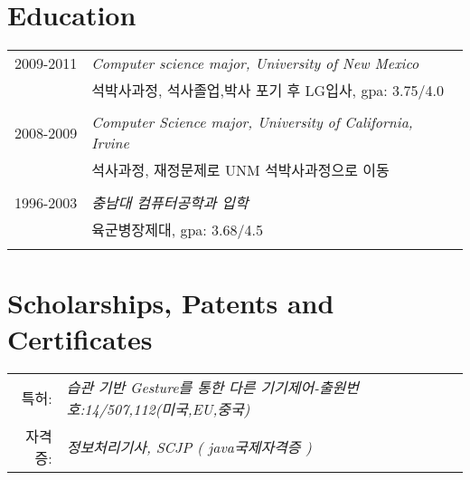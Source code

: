 \documentclass[a4paper,10pt]{article} %
\begin{document}
\bigskip
\section{Education}

\begin{tabular}{r|p{11cm}}
\textsc{2009-2011} & \emph{Computer science major, University of New Mexico}\\
& \footnotesize{석박사과정, 석사졸업,박사 포기 후 LG입사, gpa: 3.75/4.0 }\\
\multicolumn{2}{c}{} \\

\textsc{2008-2009} & \emph{Computer Science major, University of California, Irvine} \\
& \footnotesize{석사과정, 재정문제로 UNM 석박사과정으로 이동} \\
\multicolumn{2}{c}{} \\

\textsc{1996-2003} & \emph{충남대 컴퓨터공학과 입학}\\
& \footnotesize{육군병장제대, gpa: 3.68/4.5} \\
\multicolumn{2}{c}{} \\

\end{tabular}

\bigskip
\section{Scholarships, Patents and Certificates}

\begin{tabular}{rl}

\textsc{특허:} & \emph{습관 기반 Gesture를 통한 다른 기기제어-출원번호:14/507,112(미국,EU,중국)}\\
\textsc{자격증:}& \emph{정보처리기사, SCJP ( java국제자격증 ) }\\

\end{tabular}

\bigskip
\end{document}
